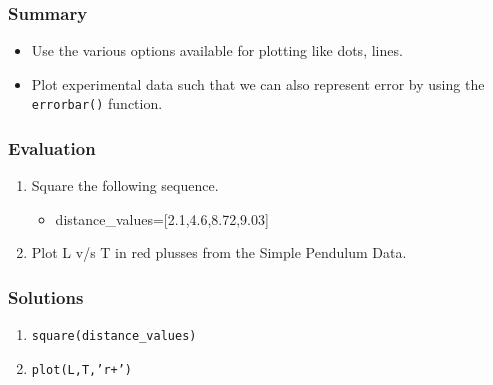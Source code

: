 \documentclass[17pt]{beamer}
\begin{document}
\begin{frame}
\frametitle{Summary}
\label{sec-8.1}
\begin{itemize}
\item Use the various options available for plotting like dots, lines.\pause
\item Plot experimental data such that we can also represent error by using the \texttt{errorbar()} function.
\end{itemize}
\end{frame}
\begin{frame}
\frametitle{Evaluation}
\label{sec-9}

\begin{enumerate}
\item Square the following sequence.
\begin{itemize}
\item distance\_values=[2.1,4.6,8.72,9.03]\pause
\end{itemize}
\vspace{8pt}
\item Plot L v/s T in red plusses from the Simple Pendulum Data.
\end{enumerate}
\end{frame}
\begin{frame}
\frametitle{Solutions}
\label{sec-10}

\begin{enumerate}
\item \texttt{square(distance\_values)}\pause
\vspace{8pt}
\item \texttt{plot(L,T,'r+')}
\end{enumerate}
\end{frame}
\end{document}

